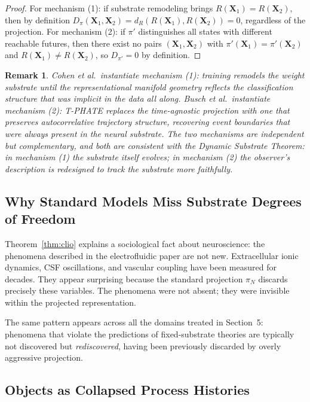 \documentclass[12pt,a4paper]{article}
\newtheorem{remark}[theorem]{Remark}
\begin{document}
\begin{proof}
For mechanism (1): if substrate remodeling brings $R(\mathbf{X}_1) = R(\mathbf{X}_2)$, then by definition $D_\pi(\mathbf{X}_1, \mathbf{X}_2) = d_R(R(\mathbf{X}_1), R(\mathbf{X}_2)) = 0$, regardless of the projection. For mechanism (2): if $\pi'$ distinguishes all states with different reachable futures, then there exist no pairs $(\mathbf{X}_1, \mathbf{X}_2)$ with $\pi'(\mathbf{X}_1) = \pi'(\mathbf{X}_2)$ and $R(\mathbf{X}_1) \neq R(\mathbf{X}_2)$, so $D_{\pi'} = 0$ by definition.
\end{proof}

\begin{remark}
Cohen et al.\ instantiate mechanism (1): training remodels the weight substrate until the representational manifold geometry reflects the classification structure that was implicit in the data all along. Busch et al.\ instantiate mechanism (2): T-PHATE replaces the time-agnostic projection with one that preserves autocorrelative trajectory structure, recovering event boundaries that were always present in the neural substrate. The two mechanisms are independent but complementary, and both are consistent with the Dynamic Substrate Theorem: in mechanism (1) the substrate itself evolves; in mechanism (2) the observer's description is redesigned to track the substrate more faithfully.
\end{remark}

\subsection{Why Standard Models Miss Substrate Degrees of Freedom}

Theorem~\ref{thm:clio} explains a sociological fact about neuroscience: the phenomena described in the electrofluidic paper are not new. Extracellular ionic dynamics, CSF oscillations, and vascular coupling have been measured for decades. They appear surprising because the standard projection $\pi_N$ discards precisely these variables. The phenomena were not absent; they were invisible within the projected representation.

The same pattern appears across all the domains treated in Section~5: phenomena that violate the predictions of fixed-substrate theories are typically not discovered but \emph{rediscovered}, having been previously discarded by overly aggressive projection.

\subsection{Objects as Collapsed Process Histories}
\end{document}
